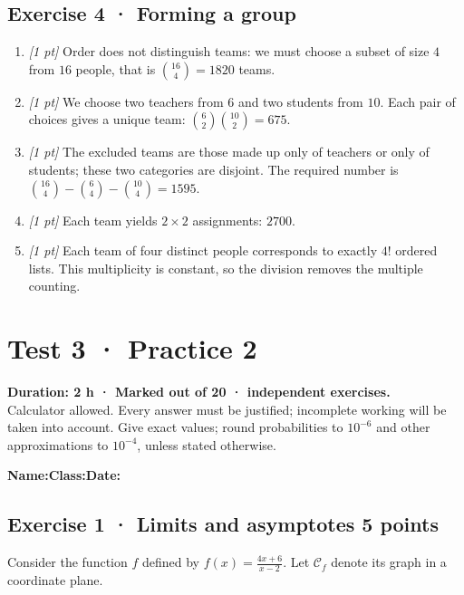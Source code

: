 \subsection*{Exercise 4 · Forming a group}\begin{enumerate}

\item \textit{[1 pt]} Order does not distinguish teams: we must choose a subset of size $4$ from $16$ people, that is $\binom{16}4=1820$ teams.

\item \textit{[1 pt]} We choose two teachers from $6$ and two students from $10$. Each pair of choices gives a unique team: $\binom{6}2\binom{10}2=675$.

\item \textit{[1 pt]} The excluded teams are those made up only of teachers or only of students; these two categories are disjoint. The required number is $\binom{16}4-\binom{6}4-\binom{10}4=1595$.

\item \textit{[1 pt]} Each team yields $2\times2$ assignments: $2700$.

\item \textit{[1 pt]} Each team of four distinct people corresponds to exactly $4!$ ordered lists. This multiplicity is constant, so the division removes the multiple counting.

\end{enumerate}

\fi

\mxnewpage{}\label{sujet:4-2}

\section*{Test 3 · Practice 2}


\textbf{Duration: 2 h · Marked out of 20 ·  independent exercises.}\\Calculator allowed. Every answer must be justified; incomplete working will be taken into account. Give exact values; round probabilities to $10^{-6}$ and other approximations to $10^{-4}$, unless stated otherwise.

\smallskip\textbf{Name:}\enspace\dotfill\quad\textbf{Class:}\enspace\dotfill\quad\textbf{Date:}\enspace\dotfill

\subsection*{Exercise 1 · Limits and asymptotes \hfill 5 points}Consider the function $f$ defined by $f(x)=\frac{4x+6}{x-2}$. Let $\mathcal C_f$ denote its graph in a coordinate plane.

